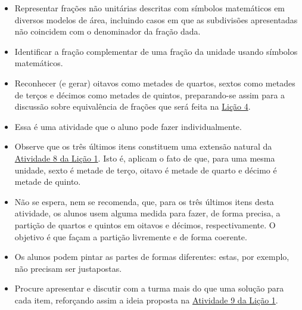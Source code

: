 \begin{atividade}\label{chap2-ativ9}
\objetivos
  \begin{itemize} %
    \item       Representar frações não unitárias descritas com símbolos matemáticos em diversos modelos de área, incluindo casos em que as subdivisões apresentadas não coincidem com o denominador da fração dada.
    \item       Identificar a fração complementar de uma fração da unidade usando símbolos matemáticos.
    \item       Reconhecer (e gerar) oitavos como metades de quartos, sextos como metades de terços e décimos como metades de quintos, preparando-se assim para a discussão sobre equivalência de frações que será feita na \hyperref[chap4]{Lição 4}.
\end{itemize} %

\discussoes
\begin{itemize} %
    \item       Essa é uma atividade que o aluno pode fazer individualmente.
    \item       Observe que os três últimos itens constituem uma extensão natural da \hyperref[chap1-ativ8]{Atividade 8 da Lição 1}. Isto é, aplicam o fato de que, para uma mesma unidade, sexto é metade de terço, oitavo é metade de quarto e décimo é metade de quinto.
    \item       Não se espera, nem se recomenda, que, para os três últimos itens desta atividade, os alunos usem alguma medida para fazer, de forma precisa, a partição de quartos e quintos em oitavos e décimos, respectivamente. O objetivo é que façam a partição livremente e de forma coerente.
    \item Os alunos podem pintar as partes de formas diferentes: estas, por exemplo, não precisam ser justapostas.
    \item Procure apresentar e discutir com a turma mais do que uma solução para cada item, reforçando assim a ideia proposta na \hyperref[chap1-ativ9]{Atividade 9 da Lição 1}.
\end{itemize} %

\solucao
\begin{center}
\renewcommand{\arraystretch}{.7}
\newcommand\fit[1]{\parbox[c][2cm]{\linewidth}{\centering#1}}


\end{center}
\end{atividade}
